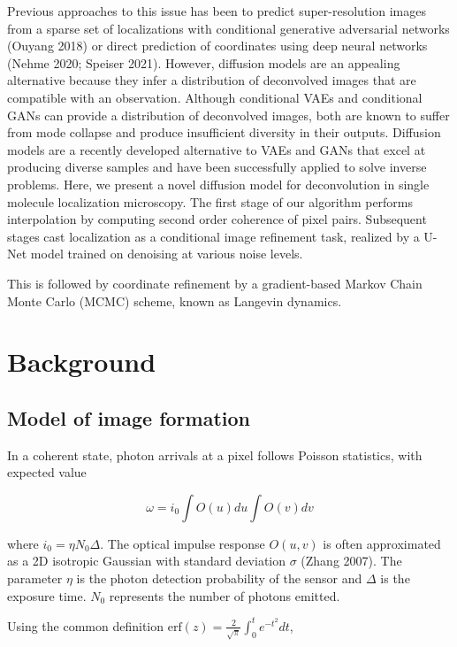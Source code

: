 \documentclass{article}
\begin{document}
Previous approaches to this issue has been to predict super-resolution images from a sparse set of localizations with conditional generative adversarial networks (Ouyang 2018) or direct prediction of coordinates using deep neural networks (Nehme 2020; Speiser 2021). However, diffusion models are an appealing alternative because they infer a distribution of deconvolved images that are compatible with an observation. Although conditional VAEs and conditional GANs can provide a distribution of deconvolved images, both are known to suffer from mode collapse and produce insufficient diversity in their outputs. Diffusion models are a recently developed alternative to VAEs and GANs that excel at producing diverse samples and have been successfully applied to solve inverse problems. Here, we present a novel diffusion model for deconvolution in single molecule localization microscopy. The first stage of our algorithm performs interpolation by computing second order coherence of pixel pairs. Subsequent stages cast localization as a conditional image refinement task, realized by a U-Net model trained on denoising at various noise levels. 

This is followed by coordinate refinement by a gradient-based Markov Chain Monte Carlo (MCMC) scheme, known as Langevin dynamics.


\section{Background}

\subsection{Model of image formation}

In a coherent state, photon arrivals at a pixel follows Poisson statistics, with expected value

\begin{equation}
\omega = i_{0}\int O(u)du\int O(v)dv
\end{equation}

where $i_{0} = \eta N_{0}\Delta$. The optical impulse response $O(u,v)$ is often approximated as a 2D isotropic Gaussian with standard deviation $\sigma$ (Zhang 2007). The parameter $\eta$ is the photon detection probability of the sensor and $\Delta$ is the exposure time. $N_{0}$ represents the number of photons emitted.

Using the common definition $\mathrm{erf}(z) = \frac{2}{\sqrt{\pi}}\int_{0}^{t}e^{-t^{2}}dt$,
\end{document}
